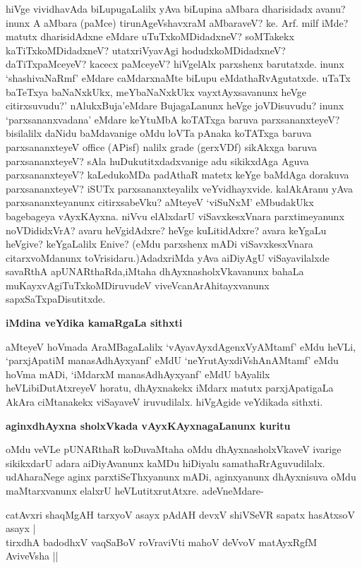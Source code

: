 \noindent
hiVge vividhavAda biLupugaLalilx yAva biLupina aMbara dharisidadx avanu? \hbox{inunx} A aMbara (paMce) tirunAgeVshavxraM aMbaraveV? ke. Arf. milf iMde? matutx dharisidAdxne eMdare uTuTxkoMDidadxneV? soMTakekx kaTiTxkoMDidadxneV? utatxriVya\-vAgi hodudxkoMDidadxneV? daTiTxpaMceyeV? kacecx paMceyeV? hiVgelAlx parxshenx baru\-tatxde. inunx `shashivaNaRmf' eMdare caMdarxnaMte biLupu eMdathaRvAgutatxde. uTaTx baTeTxya baNaNxkUkx, meYbaNaNxkUkx vayxtAyxsavanunx heVge citirxsuvudu?' nAlukxBuja'\break \hbox{eMdare} BujagaLanunx heVge joVDisuvudu? inunx `parxsananxvadana' eMdare keYtuMbA koTATxga baruva parxsananxteyeV? bisilalilx daNidu baMdavanige oMdu loVTa pAnaka koTATxga baruva parxsananxteyeV {\rm office} (APisf) nalilx {\rm grade} (gerxVDf) sikAkxga baruva parxsananxteyeV? sAla huDukutitxdadxvanige adu sikikxdAga Aguva parxsananxteyeV? kaLedu\-koMDa padAthaR matetx keYge baMdAga dorakuva parxsananxteyeV? iSUTx parxsananxteyalilx veYvidhayxvide. kalAkAranu yAva parxsananxteyanunx citirxsabeVku? aMteyeV `viSuNxM' eMbudakUkx bagebageya vAyxKAyxna. niVvu elAlxdarU viSavxkesxVnara parxtimeyanunx noVDididxVrA? avaru heVgidAdxre? heVge kuLitidAdxre? avara keYgaLu heVgive? keYgaLalilx Enive? (eMdu parxshenx mADi viSavxkesxVnara citarxvoMdanunx toVrisidaru.)\break AdadxriMda yAva aiDiyAgU viSayavilalxde savaRthA apUNARthaRda,\break iMtaha dhAyxnasholxVkavanunx bahaLa muKayx\-vAgiTuTxkoMDiruvudeV viveVcanA\-rAhitayx\-vanunx sapxSaTxpaDisutitxde.

{\bigskip
\noindent
{\large\bf iMdina veYdika kamaRgaLa sithxti}}\label{pages208}
\medskip

\noindent
aMteyeV hoVmada AraMBagaLalilx `vAyavAyxdAgenxVyAMtamf'\label{208} eMdu heVLi, `parxjApatiM manasA\-dhAyxyanf' eMdU `neYrutAyxdiVshAnAMtamf' eMdu hoVma mADi, `iMdarxM manasAdhAyxyanf' eM\-dU bAyalilx heVLibiDutAtxreyeV horatu, dhAyxnakekx iMdarx matutx parxjApatigaLa AkAra ciMtanakekx viSa\-yaveV iruvudilalx. hiVgAgide veYdikada sithxti.

{\bigskip
\noindent
{\large\bf aginxdhAyxna sholxVkada vAyxKAyxnagaLanunx kuritu }}\label{page208}
\medskip

\noindent
oMdu veVLe pUNARthaR koDuvaMtaha oMdu dhAyxnasholxVkaveV ivarige sikikxdarU adara aiDiyA\-vanunx kaMDu hiDiyalu samathaRrAguvudilalx. udAharaNege aginx parxtiSeThxyanunx mADi, aginx\-yanunx dhAyxnisuva oMdu maMtarxvanunx elalxrU heVLutitxrutAtxre. adeVneMdare-

\begin{shloka}
catAvxri shaqMgAH tarxyoV asayx pAdAH devxV shiVSeVR sapatx hasAtxsoV asayx |\\\label{208}
tirxdhA badodhxV vaqSaBoV roVraviVti mahoV deVvoV matAyxRgfM AviveVsha ||\label{117}
\end{shloka}

